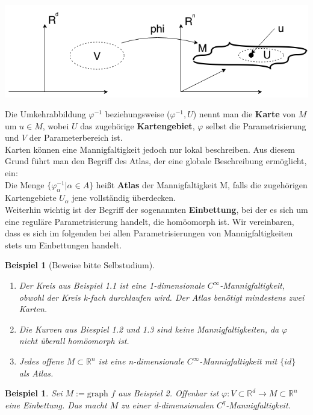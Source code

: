 \documentclass[a4paper,12pt,portrait]{book}
\newcommand{\graph}{\text{graph\ }}
\theoremstyle{theoremstyle}
\newtheorem{beispiel}[theo]{Beispiel}
\begin{document}
\begin{center}
\includegraphics[scale=0.5]{pictures/MA2_0008}\\
\end{center}
Die Umkehrabbildung $\varphi^{-1}$ beziehungsweise ($\varphi^{-1}, U$) nennt man die \textbf{Karte} von $M$ um $u\in M$, wobei $U$ das zugehörige \textbf{Kartengebiet}, $\varphi$ selbst die Parametrisierung und $V$ der Parameterbereich ist.\\
Karten können eine Mannigfaltigkeit jedoch nur lokal beschreiben. Aus diesem Grund führt man den Begriff des Atlas, der eine globale Beschreibung ermöglicht, ein:\\
Die Menge $\{\varphi^{-1}_\alpha | \alpha\in A\}$ heißt \textbf{Atlas} der Mannigfaltigkeit M, falls die zugehörigen Kartengebiete $U_\alpha$ jene vollständig überdecken.\\
\linebreak
Weiterhin wichtig ist der Begriff der sogenannten \textbf{Einbettung}, bei der es sich um eine reguläre Parametrisierung handelt, die homöomorph ist. Wir vereinbaren, dass es sich im folgenden bei allen Parametrisierungen von Mannigfaltigkeiten stets um Einbettungen handelt.
\begin{beispiel}[Beweise bitte Selbstudium]\ \\

\begin{enumerate}
\item Der Kreis aus Beispiel 1.1 ist eine 1-dimensionale $C^\infty$-Mannigfaltigkeit, obwohl der Kreis k-fach durchlaufen wird. Der Atlas benötigt mindestens zwei Karten.
\item Die Kurven aus Biespiel 1.2 und 1.3 sind keine Mannigfaltigkeiten, da $\varphi$ nicht überall homöomorph ist.
\item Jedes offene $M\subset\mathbb{R}^n$ ist eine n-dimensionale $C^\infty$-Mannigfaltigkeit mit $\{id\}$ als Atlas.
\end{enumerate}
\end{beispiel}

\begin{beispiel} Sei $M:=\graph f$ aus Beispiel 2. Offenbar ist 
$\varphi:V\subset\mathbb{R}^d\rightarrow M\subset\mathbb{R}^n$ 
eine Einbettung. Das macht $M$ zu einer d-dimensionalen $C^q$-Mannigfaltigkeit.
\end{beispiel}
\end{document}
